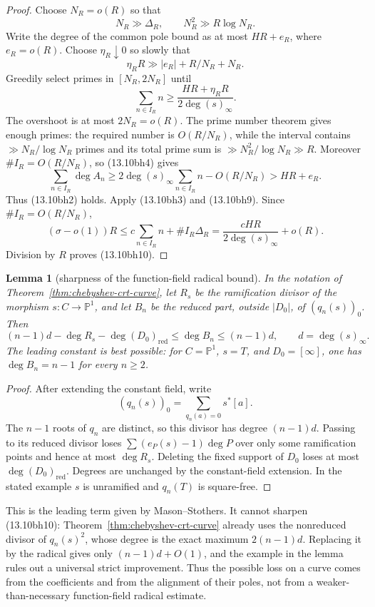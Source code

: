 \documentclass[11pt,reqno]{amsart}
\newtheorem{lemma}[theorem]{Lemma}
\theoremstyle{definition}
\theoremstyle{remark}
\begin{document}
\begin{proof}
Choose \(N_R=o(R)\) so that
\[
 N_R\gg\Delta_R,\qquad
 N_R^2\gg R\log N_R.
\]
Write the degree of the common pole bound as at most \(HR+e_R\), where
\(e_R=o(R)\).  Choose \(\eta_R\downarrow0\) so slowly that
\[
 \eta_RR\gg |e_R|+R/N_R+N_R.
\]
Greedily select primes in \([N_R,2N_R]\) until
\[
 \sum_{n\in I_R}n
 \ge\frac{HR+\eta_RR}{2\deg(s)_\infty}.
\tag{13.10bh11}
\]
The overshoot is at most \(2N_R=o(R)\).  The prime number theorem gives
enough primes: the required number is \(O(R/N_R)\), while the interval
contains \(\gg N_R/\log N_R\) primes and its total prime sum is
\(\gg N_R^2/\log N_R\gg R\).  Moreover
\(\#I_R=O(R/N_R)\), so (13.10bh4) gives
\[
 \sum_{n\in I_R}\deg A_n
 \ge2\deg(s)_\infty\sum_{n\in I_R}n
     -O(R/N_R)>HR+e_R.
\]
Thus (13.10bh2) holds.  Apply
(13.10bh3) and (13.10bh9).  Since
\(\#I_R=O(R/N_R)\),
\[
 (\sigma-o(1))R
 \le c\sum_{n\in I_R}n+\#I_R\Delta_R
 =\frac{cHR}{2\deg(s)_\infty}+o(R).
\]
Division by \(R\) proves (13.10bh10).
\end{proof}

\begin{lemma}[sharpness of the function-field radical bound]
\label{lem:chebyshev-radical-curve}
In the notation of Theorem~\ref{thm:chebyshev-crt-curve}, let \(R_s\) be
the ramification divisor of the morphism
\(s:C\to\mathbb P^1\), and let \(B_n\) be the reduced part, outside
\(|D_0|\), of \((q_n(s))_0\).  Then
\[
 (n-1)d-\deg R_s-\deg(D_0)_{\mathrm{red}}
 \le\deg B_n\le(n-1)d,\qquad d=\deg(s)_\infty.
\tag{13.10bha}
\]
The leading constant is best possible: for
\(C=\mathbb P^1\), \(s=T\), and \(D_0=[\infty]\), one has
\(\deg B_n=n-1\) for every \(n\ge2\).
\end{lemma}

\begin{proof}
After extending the constant field, write
\[
 (q_n(s))_0=\sum_{q_n(a)=0}s^*[a].
\]
The \(n-1\) roots of \(q_n\) are distinct, so this divisor has degree
\((n-1)d\).  Passing to its reduced divisor loses
\(\sum(e_P(s)-1)\deg P\) over only some ramification points and hence at
most \(\deg R_s\).  Deleting the fixed support of \(D_0\) loses at most
\(\deg(D_0)_{\mathrm{red}}\).  Degrees are unchanged by the constant-field
extension.  In the stated example \(s\) is unramified and \(q_n(T)\) is
square-free.
\end{proof}

This is the leading term given by Mason--Stothers.  It cannot sharpen
(13.10bh10): Theorem~\ref{thm:chebyshev-crt-curve} already uses the
nonreduced divisor of \(q_n(s)^2\), whose degree is the exact maximum
\(2(n-1)d\).  Replacing it by the radical gives only
\((n-1)d+O(1)\), and the example in the lemma rules out a universal strict
improvement.  Thus the possible loss on a curve comes from the coefficients
and from the alignment of their poles, not from a weaker-than-necessary
function-field radical estimate.
\end{document}
